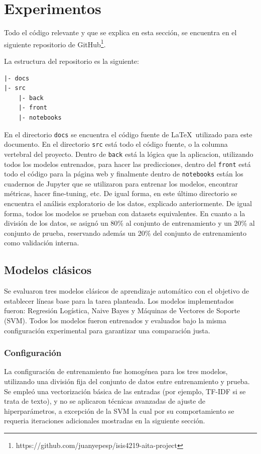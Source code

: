 \section{Experimentos}\label{sec:experimentos}

Todo el código relevante y que se explica en esta sección, se encuentra en el siguiente repositorio de GitHub\footnote{https://github.com/juanyepesp/isis4219-aita-project}.

La estructura del repositorio es la siguiente:

\begin{verbatim}
|- docs
|- src
    |- back
    |- front
    |- notebooks
\end{verbatim}

En el directorio \verb|docs| se encuentra el código fuente de \LaTeX   \ utilizado para este documento. En el directorio \verb|src| está todo el código fuente, o la columna vertebral del proyecto. Dentro de \verb|back| está la lógica que la aplicacion, utilizando todos los modelos entrenados, para hacer las predicciones, dentro del \verb|front| está todo el código para la página web y finalmente dentro de \verb|notebooks| están los cuadernos de Jupyter que se utilizaron para entrenar los modelos, encontrar métricas, hacer fine-tuning, etc. De igual forma, en este último directorio se encuentra el análisis exploratorio de los datos, explicado anteriormente. De igual forma, todos los modelos se prueban con datasets equivalentes. En cuanto a la división de los datos, se asignó un 80\% al conjunto de entrenamiento y un 20\% al conjunto de prueba, reservando además un 20\% del conjunto de entrenamiento como validación interna.

\subsection{Modelos clásicos}

Se evaluaron tres modelos clásicos de aprendizaje automático con el objetivo de establecer líneas base para la tarea planteada. Los modelos implementados fueron: Regresión Logística, Naive Bayes y Máquinas de Vectores de Soporte (SVM). Todos los modelos fueron entrenados y evaluados bajo la misma configuración experimental para garantizar una comparación justa.

\subsubsection{Configuración}
La configuración de entrenamiento fue homogénea para los tres modelos, utilizando una división fija del conjunto de datos entre entrenamiento y prueba. Se empleó una vectorización básica de las entradas (por ejemplo, TF-IDF si se trata de texto), y no se aplicaron técnicas avanzadas de ajuste de hiperparámetros, a excepción de la SVM la cual por su comportamiento se requeria iteraciones adicionales mostradas en la siguiente sección.

